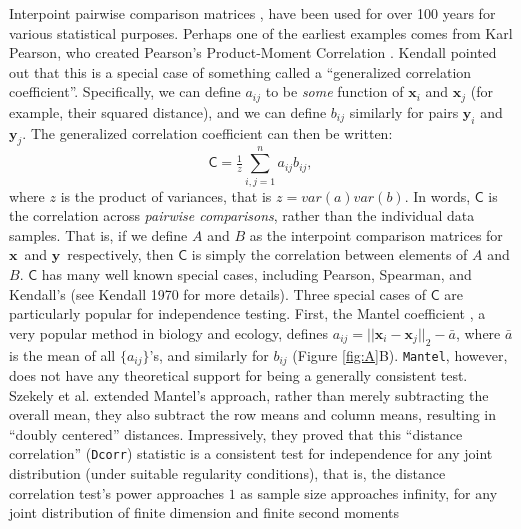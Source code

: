 \documentclass[11pt]{article}
\providecommand{\sct}[1]{{\sc \texttt{#1}}}
\providecommand{\mb}[1]{\boldsymbol{#1}}
\newcommand{\G}{\mathsf{C}}
\newcommand{\Dcorr}{\sct{Dcorr}}
\newcommand{\Mantel}{\sct{Mantel}}
\newcommand{\mbx}{\ensuremath{\mb{x}}}
\newcommand{\mby}{\ensuremath{\mb{y}}}
\begin{document}
Interpoint pairwise comparison matrices \cite{Maa83}, have been used for over 100 years for various statistical purposes. Perhaps one of the earliest examples  comes from  Karl Pearson, who created Pearson's Product-Moment Correlation \cite{Pearson1895}.  
Kendall  \cite{KendallBook} pointed out that this is a special case of something called a  ``generalized correlation coefficient''.
Specifically, we can define $a_{ij}$ to be \emph{some} function of $\mbx_i$ and $\mbx_j$  (for example, their squared distance), and we can define $b_{ij}$ similarly for pairs $\mby_i$ and $\mby_j$.  The generalized correlation coefficient can then be written:
\begin{equation}
\label{generalCoef}
\G= \tfrac{1}{z} {\textstyle \sum_{i,j=1}^n a_{ij} b_{ij} }
, 
\end{equation}
where $z$ is the product of variances, that is $z=var(a) var(b)$.
In words, $\G$ is the correlation across \emph{pairwise comparisons}, rather than the individual data samples.  That is, if we define $A$ and $B$ as the interpoint comparison matrices for \mbx~and \mby~respectively, then $\G$ is simply the correlation between elements of $A$ and $B$.    
$\G$ has many well known special cases, including Pearson, Spearman, and Kendall's (see Kendall 1970 for more details). 
Three special cases of $\G$ are particularly popular for independence testing.  First, the Mantel coefficient \cite{Mantel1967}, a very popular method in biology and ecology, 
defines $a_{ij}=||\mbx_i-\mbx_j||_{2} - \bar{a}$, where $\bar{a}$ is the mean of all $\{a_{ij}\}$'s, and similarly for $b_{ij}$ 
(Figure \ref{fig:A}B). 
\Mantel, however, does not have any theoretical support for being a generally consistent test. 
Szekely et al. \cite{SzekelyRizzoBakirov2007} extended Mantel's approach, rather than merely subtracting the overall mean, they also subtract the row means and column means, resulting in ``doubly centered'' distances.  Impressively, they proved that this ``distance correlation'' (\Dcorr) statistic is a consistent test for independence for any joint distribution (under suitable regularity conditions), that is, the distance correlation test's power approaches $1$ as sample size approaches infinity, for any joint distribution of finite dimension and finite second moments
\end{document}
